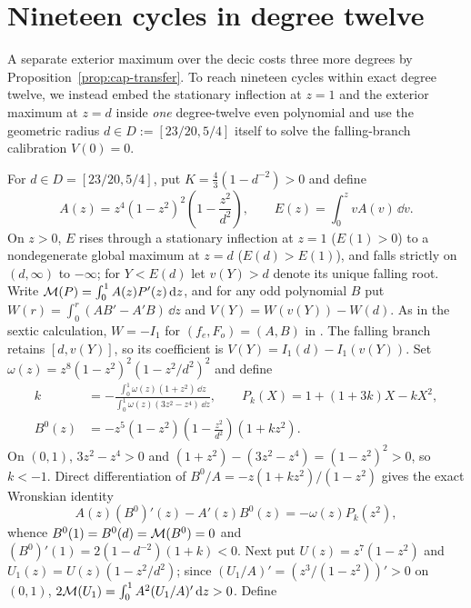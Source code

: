 \section{Nineteen cycles in degree twelve}\label{subsec:deg12-prep}
A separate exterior maximum over the decic costs three more degrees by Proposition~\ref{prop:cap-transfer}. To reach nineteen cycles within exact degree twelve, we instead embed the stationary inflection at $z=1$ and the exterior maximum at $z=d$ inside \emph{one} degree-twelve even polynomial and use the geometric radius $d\in D:=[23/20,5/4]$ itself to solve the falling-branch calibration $V(0)=0$.

For $d\in D=[23/20,5/4]$, put $K=\frac43(1-d^{-2})>0$ and define
\begin{equation}\label{eq:deg12-even}
  A(z) = z^4(1-z^2)^2\!\left(1-\frac{z^2}{d^2}\right),\qquad E(z) = \int_0^z vA(v)\,\dd v.
\end{equation}
On $z>0$, $E$ rises through a stationary inflection at $z=1$ ($E(1)>0$) to a nondegenerate global maximum at $z=d$ ($E(d)>E(1)$), and falls strictly on $(d,\infty)$ to $-\infty$; for $Y<E(d)$ let $v(Y)>d$ denote its unique falling root. Write $\mathcal{M}(P)=\int_0^1 A(z)P'(z)\,\mathrm{d} z$, and for any odd polynomial $B$ put $W(r)=\int_0^r(AB'-A'B)\,\dd z$ and $V(Y)=W(v(Y))-W(d)$. As in the sextic calculation,
$W=-I_1$ for $(f_e,F_o)=(A,B)$ in \cite[Proposition~1]{DMH2015}.
The falling branch retains $[d,v(Y)]$, so its coefficient is
$V(Y)=I_1(d)-I_1(v(Y))$. Set $\omega(z)=z^8(1-z^2)^2(1-z^2/d^2)^2$ and define
\begin{equation}\label{eq:deg12-B0}
  \begin{aligned}
    k &= -\frac{\int_0^1\omega(z)(1+z^2)\,\dd z}{\int_0^1\omega(z)(3z^2-z^4)\,\dd z},\qquad P_k(X)=1+(1+3k)X-kX^2,\\
    B^0(z) &= -z^5(1-z^2)\!\left(1-\frac{z^2}{d^2}\right)\!(1+kz^2).
  \end{aligned}
\end{equation}
On $(0,1)$, $3z^2-z^4>0$ and $(1+z^2)-(3z^2-z^4)=(1-z^2)^2>0$, so $k<-1$. Direct differentiation of $B^0/A= -z(1+kz^2)/(1-z^2)$ gives the exact Wronskian identity
\begin{equation}\label{eq:deg12-wronskian}
  A(z)(B^0)'(z) - A'(z)B^0(z) = -\omega(z) P_k(z^2),
\end{equation}
whence $B^0(1)=B^0(d)=\mathcal{M}(B^0)=0$ and $(B^0)'(1)=2(1-d^{-2})(1+k)<0$. Next put $U(z)=z^7(1-z^2)$ and $U_1(z)=U(z)(1-z^2/d^2)$; since $(U_1/A)'=(z^3/(1-z^2))'>0$ on $(0,1)$, $2\mathcal{M}(U_1)=\int_0^1 A^2(U_1/A)'\,\mathrm{d} z>0$. Define
